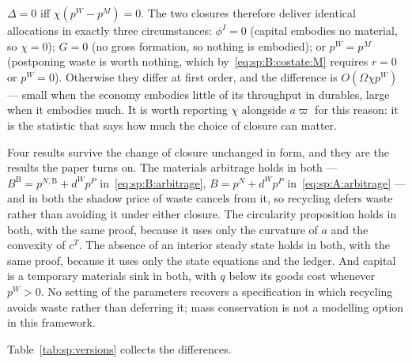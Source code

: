 \begin{remark}\label{rem:sp:coincide}
$\Delta=0$ iff $\chi\left(p^W-p^M\right)=0$. The two closures therefore deliver identical allocations in
exactly three circumstances: $\phi^I=0$ (capital embodies no material, so $\chi=0$); $G=0$ (no gross
formation, so nothing is embodied); or $p^W=p^M$ (postponing waste is worth nothing, which
by~\eqref{eq:sp:B:costate:M} requires $r=0$ or $p^W=0$). Otherwise they differ at first order, and the
difference is $O\!\left(\Omega\chi p^W\right)$ --- small when the economy embodies little of its
throughput in durables, large when it embodies much. It is worth reporting $\chi$ alongside $a\varpi$ for
this reason: it is the statistic that says how much the choice of closure can matter.
\end{remark}

 Four results survive the change of closure unchanged in form, and
they are the results the paper turns on. The materials arbitrage holds in both --- $B^{\mathrm B}=p^{N,\mathrm B}+d^Wp^P$
in~\eqref{eq:sp:B:arbitrage}, $B=p^N+d^Wp^P$ in~\eqref{eq:sp:A:arbitrage} --- and
in both the shadow price of waste cancels from it, so recycling defers waste rather than avoiding it
under either closure. The circularity proposition holds in both, with the same proof, because it uses
only the curvature of $a$ and the convexity of $c^T$. The absence of an interior steady state holds in
both, with the same proof, because it uses only the state equations and the ledger. And capital is a
temporary materials sink in both, with $q$ below its goods cost whenever $p^W>0$. No setting of the
parameters recovers a specification in which recycling avoids waste rather than deferring it; mass
conservation is not a modelling option in this framework.

 Table~\ref{tab:sp:versions} collects the differences.

